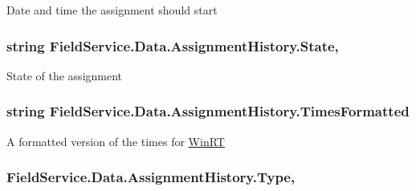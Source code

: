 Date and time the assignment should start 

\hypertarget{class_field_service_1_1_data_1_1_assignment_history_a7ee8042b0318061d9411f0cdf6ac319f}{
\subsubsection[{State}]{\setlength{\rightskip}{0pt plus 5cm}string Field\+Service.\+Data.\+Assignment\+History.\+State\hspace{0.3cm}{\ttfamily [get]}, {\ttfamily [set]}}}\label{class_field_service_1_1_data_1_1_assignment_history_a7ee8042b0318061d9411f0cdf6ac319f}


State of the assignment 

\hypertarget{class_field_service_1_1_data_1_1_assignment_history_a84096ce95d07372d223f20c1be34549f}{
\subsubsection[{Times\+Formatted}]{\setlength{\rightskip}{0pt plus 5cm}string Field\+Service.\+Data.\+Assignment\+History.\+Times\+Formatted\hspace{0.3cm}{\ttfamily [get]}}}\label{class_field_service_1_1_data_1_1_assignment_history_a84096ce95d07372d223f20c1be34549f}


A formatted version of the times for \hyperlink{namespace_field_service_1_1_win_r_t}{Win\+R\+T} 

\hypertarget{class_field_service_1_1_data_1_1_assignment_history_a4fc66110defa0c09b59329131891e9d3}{
\subsubsection[{Type}]{ Field\+Service.\+Data.\+Assignment\+History.\+Type\hspace{0.3cm}{\ttfamily [get]}, {\ttfamily [set]}}}\label{class_field_service_1_1_data_1_1_assignment_history_a4fc66110defa0c09b59329131891e9d3}


